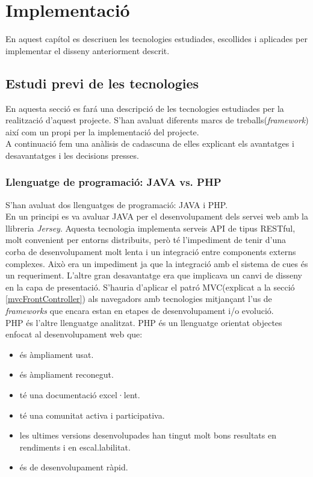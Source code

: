 \chapter{Implementaci\'{o}}
\label{cha:implementation}
En aquest capítol es descriuen les tecnologies estudiades, escollides i aplicades per implementar el disseny anteriorment descrit.\\


\section{Estudi previ de les tecnologies}
En aquesta secci\'{o} es far\'{a} una descripci\'{o} de les tecnologies estudiades per la realització d'aquest projecte. S'han avaluat diferents marcs de treballs(\textit{framework}) així com un propi per la implementació del projecte.\\

A continuació fem una anàlisis de cadascuna de elles explicant els avantatges i desavantatges i les decisions presses.

\subsection{Llenguatge de programació: JAVA vs. PHP}
S'han avaluat dos llenguatges de programació: JAVA i PHP.\\

En un principi es va avaluar JAVA per el desenvolupament dels servei web amb la llibreria \textit{Jersey}.\cite{jersey} Aquesta tecnologia implementa serveis API de tipus RESTful, molt convenient per entorns distribuits, però t\'{e} l'impediment de tenir d'una corba de desenvolupament molt lenta i un integració entre components externs complexes. Això era un impediment ja que la integració amb el sistema de cues \'{e}s un requeriment. L'altre gran desavantatge era que implicava un canvi de disseny en la capa de presentació. S'hauria d'aplicar el patró MVC(explicat a la secció \ref{mvcFrontController}) als navegadors amb tecnologies mitjançant l'us de \textit{frameworks} que encara estan en etapes de desenvolupament i/o evolució.\\

PHP \'{e}s l'altre llenguatge analitzat. PHP \'{e}s un llenguatge orientat objectes enfocat al desenvolupament web que:
\begin{itemize}
\item \'{e}s àmpliament usat.
\item \'{e}s àmpliament reconegut.
\item t\'{e} una documentació excel·lent.
\item t\'{e} una comunitat activa i participativa.
\item les ultimes versions desenvolupades han tingut molt bons resultats en rendiments i en escal.labilitat.
\item \'{e}s de desenvolupament ràpid.
\end{itemize}

